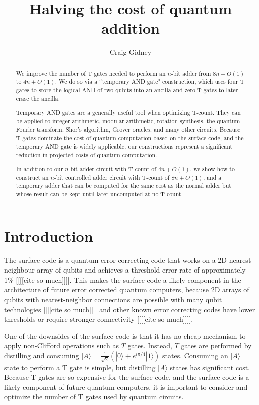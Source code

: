 \documentclass[twocolumn,longbibliography]{quantumarticle-customized}
\title{Halving the cost of quantum addition}
\author{Craig Gidney}
\affiliation{Google, Santa Barbara, CA 93117, USA}
\begin{document}
\maketitle

\begin{abstract}
We improve the number of T gates needed to perform an $n$-bit adder from $8n + O(1)$ \cite{Cuccaro2004, Amy2013, AustinDiscussionsAndEmails2017} to $4n + O(1)$.
We do so via a ``temporary AND gate" construction, which uses four T gates to store the logical-AND of two qubits into an ancilla and zero T gates to later erase the ancilla.

Temporary AND gates are a generally useful tool when optimizing T-count.
They can be applied to integer arithmetic, modular arithmetic, rotation synthesis, the quantum Fourier transform, Shor's algorithm, Grover oracles, and many other circuits.
Because T gates dominate the cost of quantum computation based on the surface code, and the temporary AND gate is widely applicable, our constructions represent a significant reduction in projected costs of quantum computation.

In addition to our $n$-bit adder circuit with T-count of $4n + O(1)$, we show how to construct an $n$-bit controlled adder circuit with T-count of $8n + O(1)$, and a temporary adder that can be computed for the same cost as the normal adder but whose result can be kept until later uncomputed at no T-count.
\end{abstract}


\section{Introduction}
\label{sec:introduction}

The surface code is a quantum error correcting code that works on a 2D nearest-neighbour array of qubits and achieves a threshold error rate of approximately 1\% [[[[cite so much]]]].
This makes the surface code a likely component in the architecture of future error corrected quantum computers, because 2D arrays of qubits with nearest-neighbor connections are possible with many qubit technologies [[[[cite so much]]]] and other known error correcting codes have lower thresholds or require stronger connectivity [[[[cite so much]]]].

One of the downsides of the surface code is that it has no cheap mechanism to apply non-Clifford operations such as $T$ gates.
Instead, $T$ gates are performed by distilling and consuming $|A\rangle = \frac{1}{\sqrt{2}} (|0\rangle + e^{i \pi/4} |1\rangle)$ states.
Consuming an $|A\rangle$ state to perform a T gate is simple, but distilling $|A\rangle$ states has significant cost.
Because T gates are so expensive for the surface code, and the surface code is a likely component of future quantum computers, it is important to consider and optimize the number of T gates used by quantum circuits.
\end{document}
